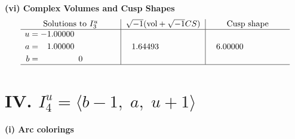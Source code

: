 \documentclass[1p]{elsarticle_modified}
\theoremstyle{definition}
\newcommand{\I}{\sqrt{-1}}
\begin{document}
\newpage\flushleft \textbf{(vi) Complex Volumes and Cusp Shapes}
$$\begin{array}{c|c|c}  
\text{Solutions to }I^u_{3}& \I (\text{vol} + \sqrt{-1}CS) & \text{Cusp shape}\\
 \hline 
\begin{aligned}
u &= -1.00000\phantom{ +0.000000I} \\
a &= \phantom{-}1.00000\phantom{ +0.000000I} \\
b &= \phantom{-0.000000 } 0\end{aligned}
 & \phantom{-}1.64493\phantom{ +0.000000I} & \phantom{-}6.00000\phantom{ +0.000000I}\\
 \hline 
 \end{array}$$\newpage\newpage\renewcommand{\arraystretch}{1}
\centering \section*{IV. $I^u_{4}= \langle b-1,\;a,\;u+1 \rangle$}
\flushleft \textbf{(i) Arc colorings}\\
\end{document}
